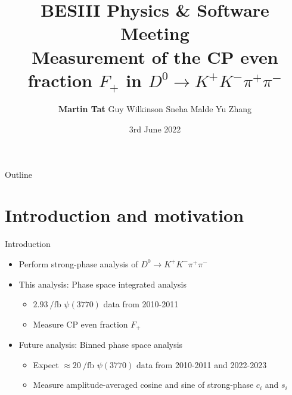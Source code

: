 \documentclass{beamer}
\title[University of Oxford]{BESIII Physics \& Software Meeting \\Measurement of the CP even fraction \texorpdfstring{$F_+$}{F+} in \texorpdfstring{$D^0\to K^+K^-\pi^+\pi^-$}{D2KKpipi}}
\author[Martin Tat]{\textbf{Martin Tat} \hspace{0.54em} Guy Wilkinson \hspace{0.54em} Sneha Malde \hspace{0.54em} Yu Zhang}
\institute{University of Oxford}
\date{3rd June 2022}
\begin{document}
\begin{frame}
  \titlepage
\end{frame}

\begin{frame}{Outline}
  \tableofcontents
\end{frame}

\section{Introduction and motivation}

\begin{frame}{Introduction}
  \begin{itemize}
    \setlength\itemsep{1.5em}
    \item{Perform strong-phase analysis of $D^0\to K^+K^-\pi^+\pi^-$}
    \item{This analysis: Phase space integrated analysis}
    \begin{itemize}
      \item{$\SI{2.93}{\per\femto\barn}$ $\psi(3770)$ data from 2010-2011}
      \item{Measure CP even fraction $F_+$}
    \end{itemize}
    \item{Future analysis: Binned phase space analysis}
    \begin{itemize}
      \item{Expect $\approx\SI{20}{\per\femto\barn}$ $\psi(3770)$ data from 2010-2011 and 2022-2023}
      \item{Measure amplitude-averaged cosine and sine of strong-phase $c_i$ and $s_i$}
    \end{itemize}
  \end{itemize}
\end{frame}
\end{document}
